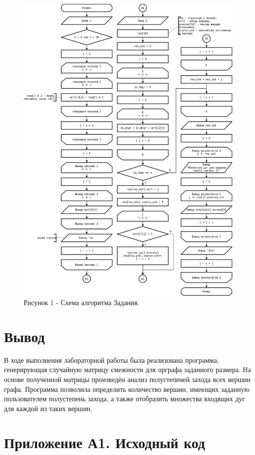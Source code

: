 \documentclass[oneside,a4paper,14pt]{extarticle}
\begin{document}
\clearpage
\begin{figure}[H]
	\centering
	\includegraphics[height=0.9\textheight]{pics/flowchart.png}
	\caption*{Рисунок 1 - Схема алгоритма Задания.}
\end{figure}

\section*{Вывод}


В ходе выполнения лабораторной работы была реализована программа, генерирующая случайную матрицу смежности для орграфа заданного размера. На основе полученной матрицы произведён анализ полустепеней захода всех вершин графа. Программа позволила определить количество вершин, имеющих заданную пользователем полустепень захода, а также отобразить множества входящих дуг для каждой из таких вершин.
\newpage
\section*{Приложение А1. Исходный код}
\inputminted{rust}{src/main.rs}
\end{document}
